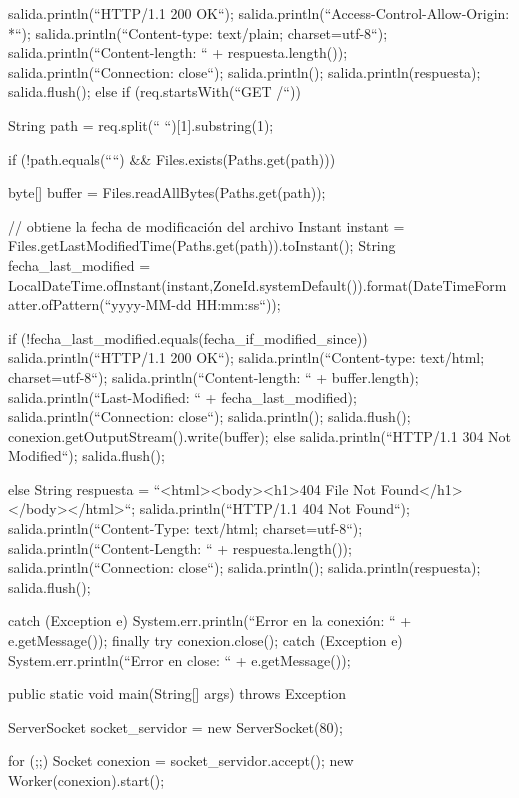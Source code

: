 \begin{SourceCode}
{{{{{          salida.println(``HTTP/1.1 200 OK``);
          salida.println(``Access-Control-Allow-Origin: *``);
          salida.println(``Content-type: text/plain; charset=utf-8``);
          salida.println(``Content-length: `` + respuesta.length());
          salida.println(``Connection: close``);
          salida.println();
          salida.println(respuesta);
          salida.flush();
        }
        else
        if (req.startsWith(``GET /``))
        {
          String path = req.split(`` ``)[1].substring(1);

          if (!path.equals(````) && Files.exists(Paths.get(path)))
          {
            byte[] buffer = Files.readAllBytes(Paths.get(path));

            // obtiene la fecha de modificación del archivo
            Instant instant = Files.getLastModifiedTime(Paths.get(path)).toInstant();
            String fecha_last_modified = LocalDateTime.ofInstant(instant,ZoneId.systemDefault()).format(DateTimeFormatter.ofPattern(``yyyy-MM-dd HH:mm:ss``));

            if (!fecha_last_modified.equals(fecha_if_modified_since))
            {
              salida.println(``HTTP/1.1 200 OK``);
              salida.println(``Content-type: text/html; charset=utf-8``);
              salida.println(``Content-length: `` + buffer.length);
              salida.println(``Last-Modified: `` + fecha_last_modified);
              salida.println(``Connection: close``);
              salida.println();
              salida.flush();
	            conexion.getOutputStream().write(buffer);
            }
            else
            {
              salida.println(``HTTP/1.1 304 Not Modified``);
              salida.flush();
            }
          }
          else
          {
            String respuesta = ``<html><body><h1>404 File Not Found</h1></body></html>``;
            salida.println(``HTTP/1.1 404 Not Found``);
            salida.println(``Content-Type: text/html; charset=utf-8``);
            salida.println(``Content-Length: `` + respuesta.length());
            salida.println(``Connection: close``);
            salida.println();
            salida.println(respuesta);
            salida.flush();
          }
        }
      }
      catch (Exception e)
      {
        System.err.println(``Error en la conexión: `` + e.getMessage());
      }
      finally
      {
        try
        {
          conexion.close();
        }
        catch (Exception e)
        {
          System.err.println(``Error en close: `` + e.getMessage());
        }
      }
    }
  }

  public static void main(String[] args) throws Exception
  {
    ServerSocket socket_servidor = new ServerSocket(80);

    for (;;)
    {
      Socket conexion = socket_servidor.accept();
      new Worker(conexion).start();
    }
  }
}
\end{SourceCode}

